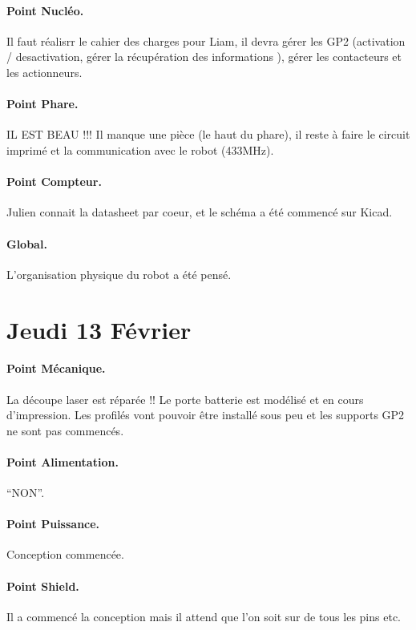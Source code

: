 \documentclass[a4paper,10pt]{report}
\begin{document}
\begin{spacing}{1.5}
\paragraph{Point Nucléo.} Il faut réalisrr le cahier des charges pour Liam, il devra
gérer les GP2 (activation / desactivation, gérer la récupération des informations
), gérer les contacteurs et les actionneurs.
\paragraph{Point Phare.} IL EST BEAU !!! Il manque une pièce (le haut du phare),
il reste à faire le circuit imprimé et la communication avec le robot (433MHz).
\paragraph{Point Compteur.} Julien connait la datasheet par coeur, et le schéma
a été commencé sur Kicad.
\paragraph{Global.} L'organisation physique du robot a été pensé.

\newpage
\section*{Jeudi 13 Février}
\paragraph{Point Mécanique.} La découpe laser est réparée !! Le porte batterie
est modélisé et en cours d'impression. Les profilés vont pouvoir être installé
sous peu et les supports GP2 ne sont pas commencés. \\

\paragraph{Point Alimentation.} ``NON''.

\paragraph{Point Puissance.} Conception commencée.

\paragraph{Point Shield.} Il a commencé la conception mais il attend que l'on soit sur
de tous les pins etc.


\end{spacing}
\end{document}
